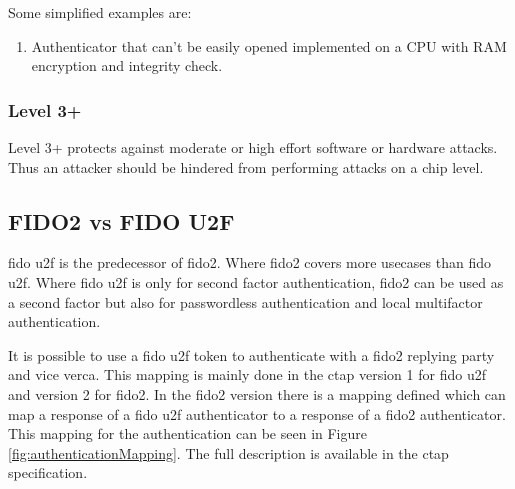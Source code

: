 \documentclass[a4paper, 11pt]{scrartcl}
\begin{document}
Some simplified examples are:
\begin{enumerate}
  \item Authenticator that can't be easily opened implemented on a CPU with RAM encryption and integrity check.
\end{enumerate}

\subsubsection{Level 3+}
Level 3+ protects against moderate or high effort software or hardware attacks. Thus an attacker should be hindered from performing attacks on a chip level. \cite{fido:authenticator:level3_plus}

\subsection{FIDO2 vs FIDO U2F}

\gls{fido} \gls{u2f} is the predecessor of \gls{fido2}. Where \gls{fido2} covers more usecases than \gls{fido} \gls{u2f}. Where \gls{fido} \gls{u2f} is only for second factor authentication, \gls{fido2} can be used as a second factor but also for passwordless authentication and local multifactor authentication. \cite{yubico:whatIsFido2}

It is possible to use a \gls{fido} \gls{u2f} token to authenticate with a \gls{fido2} replying party and vice verca. This mapping is mainly done in the \gls{ctap} version 1 for \gls{fido} \gls{u2f} and version 2 for \gls{fido2}. In the \gls{fido2} version there is a mapping defined which can map a response of a \gls{fido} \gls{u2f} authenticator to a response of a \gls{fido2} authenticator. This mapping for the authentication can be seen in Figure \ref{fig:authenticationMapping}. The full description is available in the \gls{ctap} specification. \cite{yubico:whatIsFido2, ctap:interoperability}
\end{document}
